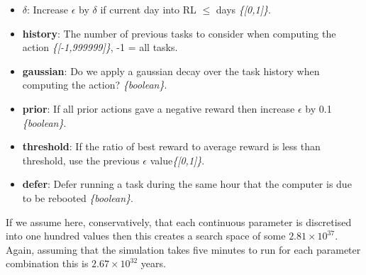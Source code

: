\documentclass[10pt, conference, compsocconf]{IEEEtran}
\begin{document}
\begin{itemize}
	\item {\bf $\delta$}: Increase $\epsilon$ by $\delta$ if current day into RL	$\leq$ days {\em \{[0,1]\}}.
	\item {\bf history}: The number of previous tasks to consider when computing the action {\em \{[-1,999999]\}}, -1 = all tasks.
	\item {\bf gaussian}: Do we apply a gaussian decay over the task history when computing the action? {\em \{boolean\}}.
	\item {\bf prior}: If all prior actions gave a negative reward then increase $\epsilon$ by 0.1 {\em \{boolean\}}.
	\item {\bf threshold}: If the ratio of best reward to average reward is less than threshold, use the previous $\epsilon$ value{\em \{[0,1]\}}.
	\item {\bf defer}: Defer running a task during the same hour that the computer is due to be rebooted {\em \{boolean\}}.
\end{itemize}
                                                                
If we assume here, conservatively, that each continuous parameter is discretised into one hundred values then this creates a search space of some $2.81 \times 10^{37}$. Again, assuming that the simulation takes five minutes to run for each parameter combination this is $2.67 \times 10^{32}$ years.

\end{document}
